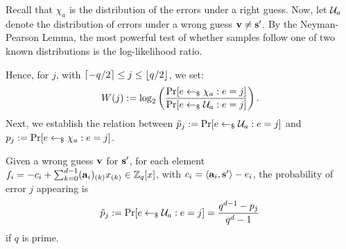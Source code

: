 Recall that $\chi_{a}$ is the distribution of the errors under a right guess. Now, let $\mathcal{U}_{a}$ denote the distribution of errors under a wrong guess $\mathbf{v} \neq \mathbf{s'}$.
By the Neyman-Pearson Lemma, the most powerful test of whether samples follow one of two known distributions is the log-likelihood ratio.

Hence, for $j$, with $\lceil -q/2 \rceil \leq j \leq \lfloor q/2\rfloor$,  we set: 
\begin{equation}
W(j) := \log_2\left(\frac{\Pr[ e \leftarrow_{\$} \chi_{a} : e = j]}{\Pr[e \leftarrow_{\$} \mathcal{U}_{a} : e = j]}\right). 
\end{equation}
Next, we establish the relation between $\tilde{p}_j := \Pr[e \leftarrow_{\$} \mathcal{U}_{a} : e = j]$ and $p_j:=\Pr[ e \leftarrow_{\$} \chi_{a} : e = j]$.

\begin{lemma}\label{lem:tildepj}
Given a wrong guess $\mathbf{v}$ for $\mathbf{s'}$, for each element $f_{i} = -c_i + \sum_{k=0}^{d-1} (\mathbf{a}_i)_{(k)} x_{(k)} \in \mathbb{Z}_q[x]$, with $c_i = \dotp{\avec_i}{\solvec} - e_i$, the probability of error $j$ appearing is
\begin{equation}
\tilde{p}_j := \Pr[e \leftarrow_{\$} \mathcal{U}_{a} : e = j] = \frac{q^{d-1}-p_j}{q^d-1}
\end{equation}
if $q$ is prime.
\end{lemma}
